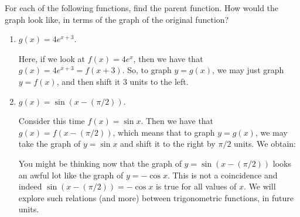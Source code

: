 \documentclass[handout, noauthor, nooutcomes]{ximera}
\begin{document}
\begin{example}
  For each of the following functions, find the parent function. How would the graph look like, in terms of the graph of the original function?
  \begin{enumerate}[label=\alph*.]
  \item $g(x) = 4e^{x+3}$. \\[.5em]
    \begin{explanation}
      Here, if we look at $f(x) = 4e^x$, then we have that $g(x) = 4e^{x+3} = f(x+3)$. So, to graph $y=g(x)$, we may just graph $y = f(x)$, and then shift it $3$ units to the left.
      \begin{image}
      \end{image}
    \end{explanation}
  \item $g(x) = \sin(x - (\pi/2))$. \\[.5em]
    \begin{explanation}
      Consider this time $f(x) = \sin x$. Then we have that $g(x) = f(x-(\pi/2))$, which means that to graph $y=g(x)$, we may take the graph of $y=\sin x$ and shift it to the right by $\pi/2$ units. We obtain:
            \begin{image}
      \end{image}
      You might be thinking now that the graph of $y = \sin(x-(\pi/2))$ looks an awful lot like the graph of $y = -\cos x$. This is not a coincidence and indeed $\sin(x-(\pi/2)) = -\cos x$ is true for all values of $x$. We will explore such relations (and more) between trigonometric functions, in future units.

\end{explanation}
\end{enumerate}
\end{example}
\end{document}
